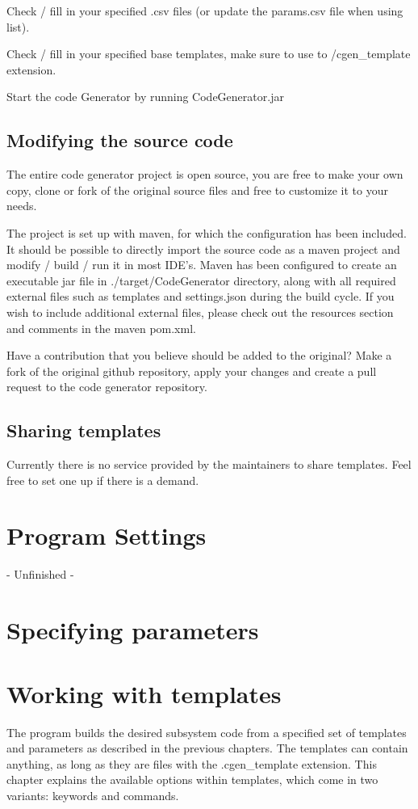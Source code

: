 \documentclass{settings/TU_Delft_Report}
\begin{document}
\vsp Check / fill in your specified .csv files (or update the params.csv file when using list).

\vsp Check / fill in your specified base templates, make sure to use to /cgen\_template extension.

\vsp Start the code Generator by running CodeGenerator.jar

\section{Modifying the source code}
The entire code generator project is open source, you are free to make your own copy, clone or fork of the original source files and free to customize it to your needs.\vsp

The project is set up with maven, for which the configuration has been included. It should be possible to directly import the source code as a maven project and modify / build / run it in most IDE's. Maven has been configured to create an executable jar file in ./target/CodeGenerator directory, along with all required external files such as templates and settings.json during the build cycle. If you wish to include additional external files, please check out the resources section and comments in the maven pom.xml.\vsp

Have a contribution that you believe should be added to the original? Make a fork of the original github repository, apply your changes and create a pull request to the code generator repository.

\section{Sharing templates}
Currently there is no service provided by the maintainers to share templates. Feel free to set one up if there is a demand.

\chapter{Program Settings}
- Unfinished -

\chapter{Specifying parameters}

\chapter{Working with templates}
The program builds the desired subsystem code from a specified set of templates and parameters as described in the previous chapters. The templates can contain anything, as long as they are files with the .cgen\_template extension. This chapter explains the available options within templates, which come in two variants: keywords and commands.
\end{document}
